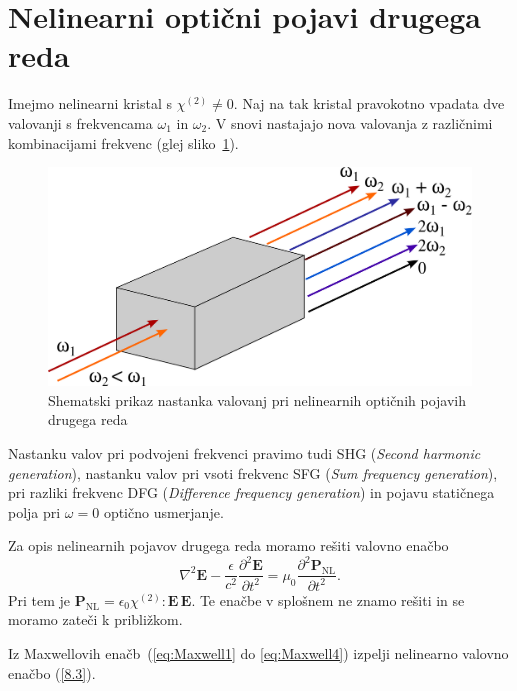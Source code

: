 \documentclass[11pt,fleqn]{book} %
\begin{document}
\section{Nelinearni optični pojavi drugega reda}

Imejmo nelinearni kristal s $\chi^{(2)} \neq 0$. Naj na tak kristal pravokotno 
vpadata dve valovanji s frekvencama
$\omega_{1}$ in $\omega_{2}$. V snovi nastajajo nova valovanja z različnimi kombinacijami
frekvenc (glej sliko~\ref{fig:nl2}).
\begin{figure}[h]
\centering
\includegraphics[width=7truecm]{slike/08_nl2.png}
\caption{Shematski prikaz nastanka valovanj pri nelinearnih optičnih pojavih drugega reda}
\label{fig:nl2}
\end{figure}


Nastanku valov pri podvojeni frekvenci pravimo tudi SHG ({\it Second harmonic generation}), 
nastanku valov pri vsoti frekvenc SFG ({\it Sum frequency generation}), 
pri razliki frekvenc DFG ({\it Difference frequency generation}) in pojavu 
statičnega polja pri $\omega = 0$ optično usmerjanje.  


Za opis nelinearnih pojavov drugega reda moramo rešiti valovno enačbo 
\begin{equation}
\nabla^{2}\mathbf{E}-\frac{\epsilon}{c^{2}}{\frac{\partial^2\mathbf{E}}{\partial t^2}}=
\mu_{0}{\frac{\partial^2\mathbf{P}_{\textrm{NL}}}{\partial t^2}}.
\label{8.3}
\end{equation}
Pri tem je $\mathbf{P}_{\textrm{NL}}=\epsilon_{0}\chi^{(2)}:\mathbf{E}\, \mathbf{E}$.
Te enačbe v splošnem ne znamo rešiti in se moramo zateči k približkom.
\begin{definition}
Iz Maxwellovih enačb~(\ref{eq:Maxwell1} do \ref{eq:Maxwell4}) izpelji 
nelinearno valovno enačbo (\ref{8.3}).
\end{definition}
\end{document}

